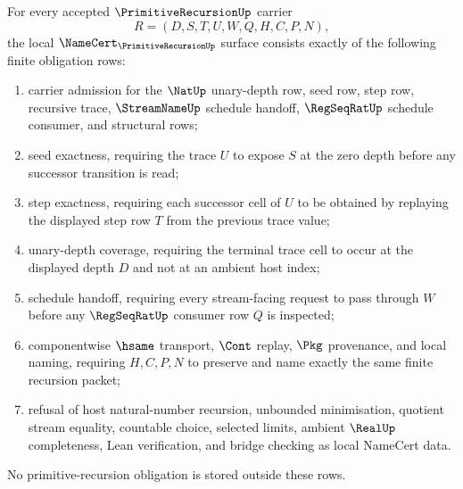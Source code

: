 \begin{theorem}
\label{thm:primitive-recursion-namecert-obligations}
For every accepted $\PrimitiveRecursionUp$ carrier
$$
R=(D,S,T,U,W,Q,H,C,P,N),
$$
the local $\NameCert_{\PrimitiveRecursionUp}$ surface consists exactly of the following finite obligation rows:
\begin{enumerate}
\item carrier admission for the $\NatUp$ unary-depth row, seed row, step row, recursive trace, $\StreamNameUp$ schedule handoff, $\RegSeqRatUp$ schedule consumer, and structural rows;
\item seed exactness, requiring the trace $U$ to expose $S$ at the zero depth before any successor transition is read;
\item step exactness, requiring each successor cell of $U$ to be obtained by replaying the displayed step row $T$ from the previous trace value;
\item unary-depth coverage, requiring the terminal trace cell to occur at the displayed depth $D$ and not at an ambient host index;
\item schedule handoff, requiring every stream-facing request to pass through $W$ before any $\RegSeqRatUp$ consumer row $Q$ is inspected;
\item componentwise $\hsame$ transport, $\Cont$ replay, $\Pkg$ provenance, and local naming, requiring $H,C,P,N$ to preserve and name exactly the same finite recursion packet;
\item refusal of host natural-number recursion, unbounded minimisation, quotient stream equality, countable choice, selected limits, ambient $\RealUp$ completeness, Lean verification, and bridge checking as local NameCert data.
\end{enumerate}
No primitive-recursion obligation is stored outside these rows.
\end{theorem}
